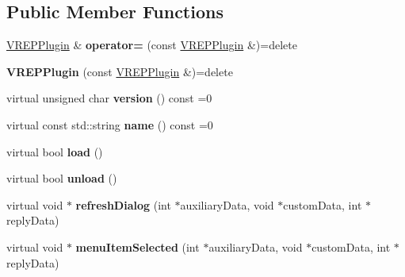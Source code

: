 \subsection*{Public Member Functions}
\begin{DoxyCompactItemize}
\item 
\hyperlink{classVREPPlugin}{V\+R\+E\+P\+Plugin} \& {\bfseries operator=} (const \hyperlink{classVREPPlugin}{V\+R\+E\+P\+Plugin} \&)=delete\hypertarget{classVREPPlugin_aac9c374d0718ea48d6ec5baa8d8ab2b2}{}\label{classVREPPlugin_aac9c374d0718ea48d6ec5baa8d8ab2b2}

\item 
{\bfseries V\+R\+E\+P\+Plugin} (const \hyperlink{classVREPPlugin}{V\+R\+E\+P\+Plugin} \&)=delete\hypertarget{classVREPPlugin_accb66d8b1e8ded95475a15a3a42c9fbc}{}\label{classVREPPlugin_accb66d8b1e8ded95475a15a3a42c9fbc}

\item 
virtual unsigned char {\bfseries version} () const =0\hypertarget{classVREPPlugin_ae5e6764e97874aa134447122bbadbf2a}{}\label{classVREPPlugin_ae5e6764e97874aa134447122bbadbf2a}

\item 
virtual const std\+::string {\bfseries name} () const =0\hypertarget{classVREPPlugin_a345987cf0e2e8aa3af817cc0213e5c7a}{}\label{classVREPPlugin_a345987cf0e2e8aa3af817cc0213e5c7a}

\item 
virtual bool {\bfseries load} ()\hypertarget{classVREPPlugin_a4149b72b671ad72f63e9a75c58c0d628}{}\label{classVREPPlugin_a4149b72b671ad72f63e9a75c58c0d628}

\item 
virtual bool {\bfseries unload} ()\hypertarget{classVREPPlugin_a49aff8a71c1c9f2af6e32b918eba99ff}{}\label{classVREPPlugin_a49aff8a71c1c9f2af6e32b918eba99ff}

\item 
virtual void $\ast$ {\bfseries refresh\+Dialog} (int $\ast$auxiliary\+Data, void $\ast$custom\+Data, int $\ast$reply\+Data)\hypertarget{classVREPPlugin_aae582606dda4aff564d102358b9af579}{}\label{classVREPPlugin_aae582606dda4aff564d102358b9af579}

\item 
virtual void $\ast$ {\bfseries menu\+Item\+Selected} (int $\ast$auxiliary\+Data, void $\ast$custom\+Data, int $\ast$reply\+Data)\hypertarget{classVREPPlugin_a320dcb5ed4beaec82975be22b5c20e39}{}\label{classVREPPlugin_a320dcb5ed4beaec82975be22b5c20e39}


\end{DoxyCompactItemize}
